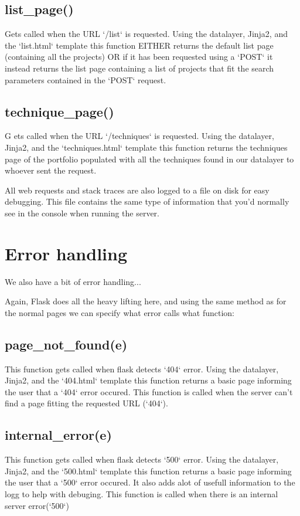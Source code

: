 \documentclass{TDP003mall}
\begin{document}
\subsection{list\_page()} 
Gets called when the URL `/list` is requested. Using the datalayer, Jinja2, and the `list.html` template this function EITHER returns the default list page (containing all the projects) OR if it has been requested using a `POST` it instead returns the list page containing a list of projects that fit the search parameters contained in the `POST` request.

\subsection{technique\_page()} G
ets called when the  URL `/techniques` is requested. Using the datalayer, Jinja2, and the `techniques.html` template this function returns the techniques page of the portfolio populated with all the techniques found in our datalayer to whoever sent the request.

All web requests and stack traces are also logged to a file on disk for easy debugging. This file contains the same type of information that you'd normally see in the console when running the server.

\section{Error handling}\label{error-handling}
We also have a bit of error handling...

Again, Flask does all the heavy lifting here, and using the same method as for the normal pages we can specify what error calls what function:

\subsection{page\_not\_found(e)} 
This function gets called when flask detects `404` error. Using the datalayer, Jinja2, and the `404.html` template this function returns a basic page informing the user that a `404` error occured. This function is called when the server can't find a page fitting the requested URL (`404`).

\subsection{internal\_error(e)}
This function gets called when flask detects `500` error. Using the datalayer, Jinja2, and the `500.html` template this function returns a basic page informing the user that a `500` error occured.
It also adds alot of usefull information to the logg to help with debuging.
This function is called when there is an internal server error(`500`)
\end{document}
